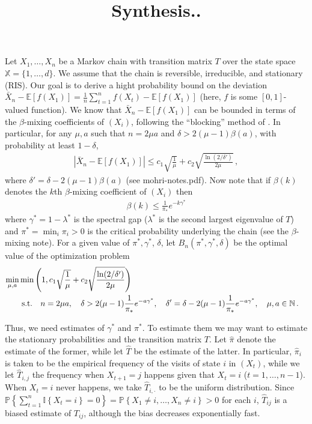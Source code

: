\documentclass[11pt]{article}
\title{Synthesis..}
\newcommand{\todoc}[2][]{\todo[size=\scriptsize,color=green!10!white,#1]{Cs: #2}} %
\newcommand{\Prob}[1]{\mathbb{P}\left\{#1\right\}}
\newcommand{\EE}[1]{\mathbb{E}\left[#1\right]}
\theoremstyle{plain}
\theoremstyle{definition}
\theoremstyle{remark}
\newcommand{\oo}[1]{\frac{1}{#1}}
\begin{document}
\maketitle


\newcommand{\XX}{\mathbb{X}}
\newcommand{\one}[1]{\mathbb{I}\left\{#1\right\}}
\newcommand{\N}{\mathbb{N}}
Let  $X_1,\ldots,X_n$ be a  Markov chain with transition matrix $T$
over the state space $\XX = \{1,\ldots,d \}$.
We assume that the chain is reversible, irreducible, and stationary (RIS).
\todoc[inline]{Fix this: We don't want stationarity.}
Our goal is to derive a hight probability bound on the deviation 
$\bar{X}_n - \EE{f(X_1)} = \frac1n \sum_{t=1}^n f(X_t) - \EE{f(X_1)}$
(here, $f$ is some $[0,1]$-valued function).
We know that $\bar{X}_n - \EE{f(X_1)}$ can be bounded in terms of the $\beta$-mixing coefficients of $(X_i)$,
following the ``blocking'' method of \cite{MR1258867}.
In particular, for any $\mu,a$ such that $n = 2\mu a$ and $\delta>2(\mu-1)\beta(a)$,
with probability at least $1-\delta$,
\begin{align}
\label{eq:xbound}
|\bar{X}_n - \EE{f(X_1)}|
\le c_1\sqrt{\frac{1}{\mu}} + c_2\sqrt{\frac{\ln(2/\delta')}{2\mu}}\,,
\end{align}
where $\delta'=\delta-2(\mu-1)\beta(a)$ (see mohri-notes.pdf).
Now note that if $\beta(k)$ denotes the $k$th $\beta$-mixing coefficient of $(X_i)$ then 
\begin{align}
\label{eq:betabound}
 \beta(k) \le \oo{\pi_*}e^{-k \gamma^*}
\end{align}
where  $\gamma^* = 1-\lambda^*$ is the spectral gap ($\lambda^*$ is the second largest eigenvalue of $T$)
and  $\pi^*  = \min_i \pi_i>0$ is the critical probability underlying the chain
(see the $\beta$-mixing note).
For a given value of $\pi^*,\gamma^*$, $\delta$, let $B_n(\pi^*,\gamma^*,\delta)$ be the optimal value of the optimization problem
\begin{align*}
\lefteqn{ \min_{\mu,a} \min\left(1, c_1\sqrt{\frac{1}{\mu}} + c_2\sqrt{\frac{\ln(2/\delta')}{2\mu}}\right) } \\
& \qquad \text{s.t.} \quad n = 2\mu a, \quad \delta>2(\mu-1)\oo{\pi_*}e^{-a \gamma^*},
\quad \delta' = \delta-2(\mu-1)\oo{\pi_*}e^{-a \gamma^*}, \quad \mu,a \in \N\,.
\end{align*}


Thus, we need estimates of $\gamma^*$ and $\pi^*$.
To estimate them we may want to estimate the stationary probabilities and the transition matrix $T$.
Let $\hat \pi$ denote the estimate of the former, while let $\hat T$ be the estimate of the latter.
In particular, $\hat \pi_i$ is taken to be the empirical frequency of the visits of state $i$ in $(X_t)$,
while we let $\hat T_{i,j}$ the frequency when 
$X_{t+1}=j$ happens given that $X_t = i$ ($t=1,\dots,n-1$). 
When $X_t = i$ never happens, we take $\hat T_{i,\cdot}$ to be the uniform distribution.
Since $\Prob{\sum_{t=1}^n \one{X_t = i}=0}=\Prob{X_1\ne i, \dots, X_n\ne i}>0$ for each $i$, $\hat T_{ij}$ is a biased estimate of $T_{ij}$, although the bias decreases exponentially fast. 
\end{document}
